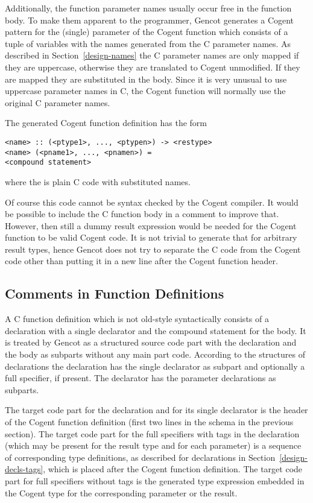 Additionally, the function parameter names usually occur free in the function body. To make them apparent to
the programmer, Gencot generates a Cogent pattern for the (single) parameter of the Cogent function which 
consists of a tuple of variables with the names generated from the C parameter names. As described in 
Section~\ref{design-names} the C parameter names are only mapped if they are uppercase, otherwise they are
translated to Cogent unmodified. If they are mapped they are substituted in the body. Since it is very unusual
to use uppercase parameter names in C, the Cogent function will normally use the original C parameter names.

The generated Cogent function definition has the form
\begin{verbatim}
<name> :: (<ptype1>, ..., <ptypen>) -> <restype>
<name> (<pname1>, ..., <pnamen>) =
<compound statement>
\end{verbatim}
where the  is plain C code with substituted names.

Of course this code cannot be syntax checked by the Cogent compiler. 
It would be possible to include the C function body in a comment to improve that. However, then
still a dummy result expression would be needed for the Cogent function to be valid Cogent code.
It is not trivial to generate that for arbitrary result types, hence Gencot does not try
to separate the C code from the Cogent code other than putting it in a new line after the 
Cogent function header.

\subsection{Comments in Function Definitions}

A C function definition which is not old-style syntactically consists of a declaration with a single declarator
and the compound statement for the body.
It is treated by Gencot as a structured source code part with the declaration and the body as subparts
without any main part code. According to the structures of declarations the declaration has the single declarator as subpart
and optionally a full specifier, if present. The declarator has the parameter declarations as subparts.

The target code part for the declaration and for its single declarator is the header of the Cogent function definition
(first two lines in the schema in the previous section). The target code part for the full specifiers with tags in
the declaration (which may be present for the result type and for each parameter) is a sequence of corresponding 
type definitions, as described for declarations in Section~\ref{design-decls-tags}, which is placed 
after the Cogent function definition. The target code part for full specifiers without tags is the generated type
expression embedded in the Cogent type for the corresponding parameter or the result.

